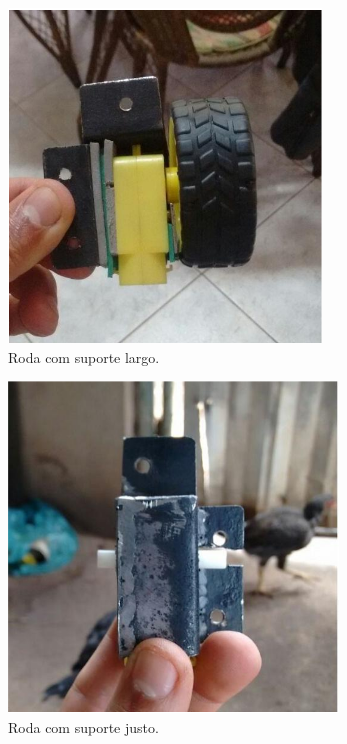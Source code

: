 \begin{itemize}
   		\begin{figure}[H]                                                           
            \centering                                                                
            \includegraphics[scale=0.5]{figuras/eixoantigo.png}               
            \caption{Roda com suporte largo.}    
            \label{img:eixoantigo}                                            
         \end{figure}

        \begin{figure}[H]                                                           
            \centering                                                                
            \includegraphics[scale=0.5]{figuras/eixonovo.png}               
            \caption{Roda com suporte justo.}    
            \label{img:eixonovo}                                            
         \end{figure}


\end{itemize}
